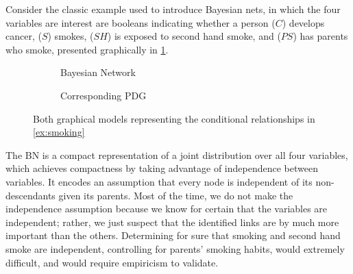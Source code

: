 \documentclass{article}
\newcommand\changed[1]{{\color{note-fg} #1}}
\newcommand{\MN}{PDG}
\begin{document}
	

	\begin{example}\label{ex:smoking}
		Consider the classic example used to introduce Bayesian nets, in which the four variables are interest are booleans indicating whether a person ($C$) develops cancer, ($S$) smokes, ($SH$) is exposed to second hand smoke, and ($PS$) has parents who smoke, presented graphically in \cref{subfig:smoking-bn}.
		\begin{figure}[ht!]
			\centering
			
			\begin{subfigure}[b]{0.3\textwidth}
				\caption{Bayesian Network}
				\label{subfig:smoking-bn}
			\end{subfigure}%
			\hspace{2em}\vline\hspace{2em}
			\begin{subfigure}[b]{0.5\textwidth}
				\caption{Corresponding \MN}
				\label{subfig:smoking-pdg}
			\end{subfigure}
		
			\caption{Both graphical models representing the conditional relationships in \cref{ex:smoking}}
			\label{fig:smoking-bn+pdg}
		\end{figure}
		
		The BN is a compact representation of a joint distribution over all four variables, which achieves compactness by taking advantage of independence between variables. It encodes an assumption that every node is independent of its non-descendants given its parents.
		Most of the time, we do not make the independence assumption because we know for certain that the variables are independent; rather, we just suspect that the identified links are by much more important than the others. Determining for sure that smoking  and second hand smoke are independent, controlling for parents' smoking habits, would extremely difficult, and would \changed{require empiricism to validate}.
		

\end{example}
\end{document}
